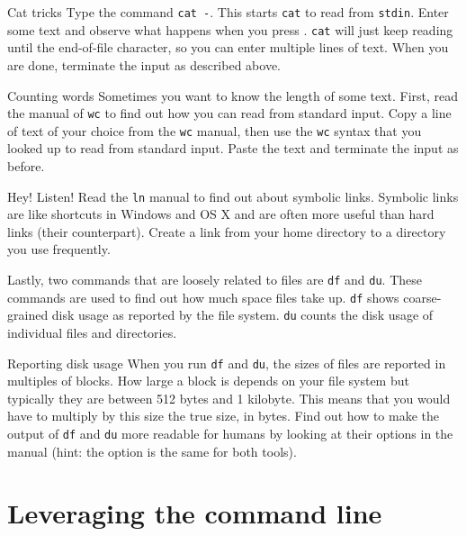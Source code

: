 \documentclass{TheAlternativeCourse}
\begin{document}
\begin{exercisebox}{Cat tricks}
	Type the command \texttt{cat -}. This starts \texttt{cat} to read from \texttt{stdin}. Enter some text and observe what happens when you press . \texttt{cat} will just keep reading until the end-of-file character, so you can enter multiple lines of text. When you are done, terminate the input as described above.
\end{exercisebox}

\begin{exercisebox}{Counting words}
	Sometimes you want to know the length of some text. First, read the manual of \texttt{wc} to find out how you can read from standard input. Copy a line of text of your choice from the \texttt{wc} manual, then use the \texttt{wc} syntax that you looked up to read from standard input. Paste the text and terminate the input as before.
\end{exercisebox}


\begin{exercisebox}{Hey! Listen!}
	Read the \texttt{ln} manual to find out about symbolic links. Symbolic links are like shortcuts in Windows and OS X and are often more useful than hard links (their counterpart). Create a link from your home directory to a directory you use frequently.
\end{exercisebox}

Lastly, two commands that are loosely related to files are \texttt{df} and \texttt{du}. These commands are used to find out how much space files take up. \texttt{df} shows coarse-grained disk usage as reported by the file system. \texttt{du} counts the disk usage of individual files and directories.

\begin{exercisebox}{Reporting disk usage}
	When you run \texttt{df} and \texttt{du}, the sizes of files are reported in multiples of blocks. How large a block is depends on your file system but typically they are between 512 bytes and 1 kilobyte. This means that you would have to multiply by this size the true size, in bytes. Find out how to make the output of \texttt{df} and \texttt{du} more readable for humans by looking at their options in the manual (hint: the option is the same for both tools).
\end{exercisebox}

\section{Leveraging the command line}
\end{document}
